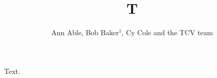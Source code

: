 \documentclass{iopart}
\begin{document}
\title{T}
\author{
Ann Able,
Bob Baker$^1$,
Cy Cole
and the TCV team}
\address{
Univ A, Lausanne \\

$^1$Univ B, Garching}
\maketitle
Text.
\end{document}
